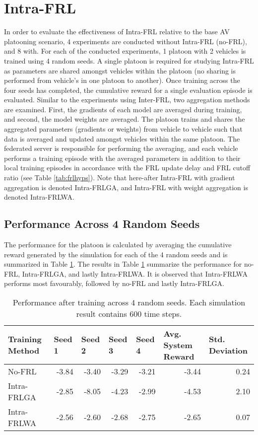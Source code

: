 \section{Intra-FRL}
In order to evaluate the effectiveness of Intra-FRL relative to the base AV platooning
scenario, 4 experiments are conducted without Intra-FRL (no-FRL), and 8 with.  For each of
the conducted experiments, 1 platoon with 2 vehicles is trained using 4 random seeds.  A
single platoon is required for studying Intra-FRL as parameters are shared amongst
vehicles within the platoon (no sharing is performed from vehicle's in one platoon to
another).  Once training across the four seeds has completed, the cumulative reward for
a single evaluation episode is evaluated.  Similar to the experiments using Inter-FRL,
two aggregation methods are examined.  First, the gradients of each model are averaged
during training, and second, the model weights are averaged.  The platoon trains and
shares the aggregated parameters (gradients or weights) from vehicle to vehicle such
that data is averaged and updated amongst vehicles within the same platoon. The federated
server is responsible for performing the averaging, and each vehicle performs a training
episode with the averaged parameters in addition to their local training episodes in
accordance with the FRL update delay and FRL cutoff ratio (see Table \ref{tab:frlhyps}).
Note that here-after Intra-FRL with gradient aggregation is denoted Intra-FRLGA, and
Intra-FRL with weight aggregation is denoted Intra-FRLWA.


\subsection{Performance Across 4 Random Seeds}
The performance for the platoon is calculated by averaging the cumulative reward generated
by the simulation for each of the 4 random seeds and is summarized in Table
\ref{tab:intrafrl-summary}. The results in Table \ref{tab:intrafrl-summary} summarize
the performance for no-FRL, Intra-FRLGA, and lastly Intra-FRLWA.  It is observed that
Intra-FRLWA performs most favourably, followed by no-FRL and lastly Intra-FRLGA.


\begin{table}[H]
  \centering
  \scriptsize
  \caption{Performance after training across 4 random seeds. Each simulation result contains 600 time steps.}
    \begin{tabular}{lrrrrrr} \toprule
    \textbf{Training Method} & \multicolumn{1}{l}{\textbf{Seed 1}} & \multicolumn{1}{l}{\textbf{Seed 2}} & \multicolumn{1}{l}{\textbf{Seed 3}} & \multicolumn{1}{l}{\textbf{Seed 4}} & \multicolumn{1}{l}{\textbf{Avg. System Reward}} & \multicolumn{1}{l}{\textbf{Std. Deviation}} \\ \midrule
    No-FRL & -3.84 & -3.40 & -3.29 & -3.21 & -3.44 & 0.24 \\
    Intra-FRLGA & -2.85 & -8.05 & -4.23 & -2.99 & -4.53 & 2.10 \\
    Intra-FRLWA & -2.56 & -2.60 & -2.68 & -2.75 & -2.65 & 0.07 \\ \bottomrule
    \end{tabular}%
  \label{tab:intrafrl-summary}%
\end{table}%

